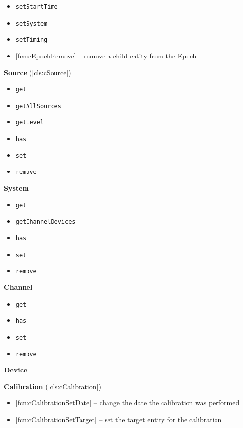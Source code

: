 \documentclass{aodatadocs}
\newcommand{\ret}[1]{\textcolor{purple5}{\texttt{#1}}}
\begin{document}
{\begin{legal}[font=\Large\bfseries, itemsep=1.5ex]
\begin{legal}[font=\large\bfseries, itemsep=1ex]
\begin{itemize}
            \item \ret{setStartTime}
            \item \ret{setSystem}
            \item \ret{setTiming}
            \item \ref{fcn:cEpochRemove} -- remove a child entity from the Epoch 
        \end{itemize}
        \item {\large\textbf{Source} (\ref{cls:cSource})}
            \begin{itemize}
                \item \ret{get}
                \item \ret{getAllSources}
                \item \ret{getLevel}
                \item \ret{has}
                \item \ret{set}
                \item \ret{remove}
            \end{itemize}
        \item {\large\textbf{System}}
            \begin{itemize}
                \item \ret{get}
                \item \ret{getChannelDevices}
                \item \ret{has}
                \item \ret{set}
                \item \ret{remove}
            \end{itemize}
        \item {\large\textbf{Channel}}
            \begin{itemize}
                \item \ret{get}
                \item \ret{has}
                \item \ret{set}
                \item \ret{remove}
            \end{itemize}
        \item {\large\textbf{Device}}
        \item {\large\textbf{Calibration} (\ref{cls:cCalibration})}
            \begin{itemize}
                \item \ref{fcn:cCalibrationSetDate} -- change the date the calibration was performed
                \item \ref{fcn:cCalibrationSetTarget} -- set the target entity for the calibration

\end{itemize}
\end{legal}
\end{legal}}
\end{document}
